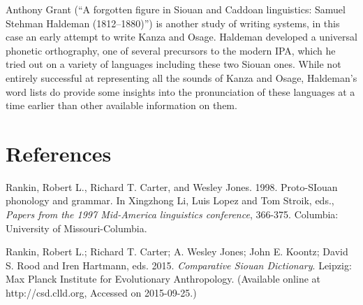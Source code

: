 \begin{refsection}
Anthony Grant (``A forgotten figure in Siouan and Caddoan linguistics: Samuel Stehman Haldeman (1812--1880)'') is another study of writing systems, in this case an early attempt to write Kanza and Osage. Haldeman developed a universal phonetic orthography, one of several precursors to the modern IPA, which he tried out on a variety of languages including these two Siouan ones. While not entirely successful at representing all the sounds of Kanza and Osage, Haldeman's word lists do provide some insights into the pronunciation of these languages at a time earlier than other available information on them. 


\section*{References}

\printbibliography[heading=subbibliography]

\begin{reflist}



Rankin, Robert L., Richard T. Carter, and Wesley Jones. 1998. Proto-SIouan phonology and grammar. In Xingzhong Li, Luis Lopez and Tom Stroik, eds., \textit{Papers from the 1997 Mid-America linguistics conference}, 366-375. Columbia: University of Missouri-Columbia.



Rankin, Robert L.; Richard T. Carter; A. Wesley Jones; John E. Koontz; David S. Rood and Iren Hartmann, eds. 2015. \textit{Comparative Siouan Dictionary}. Leipzig: Max Planck Institute for Evolutionary Anthropology. (Available online at http://csd.clld.org, Accessed on 2015-09-25.)
\end{reflist}
\end{refsection}

